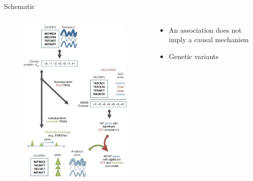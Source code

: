 \documentclass[aspectratio=169,12pt]{beamer}
\begin{document}

\begin{frame}{Schematic}

	\begin{columns}
		\begin{column}{0.5\textwidth}
			\begin{figure}
				\includegraphics[width=\textwidth]{gusev2018/1-TWAS_schematic_cropped}
			\end{figure}
		\end{column}

		\begin{column}{0.5\textwidth}
			\begin{itemize}
				\item An association does not imply a causal mechanism
				\item Genetic variants
			\end{itemize}
		\end{column}
	\end{columns}


\end{frame}
\end{document}
